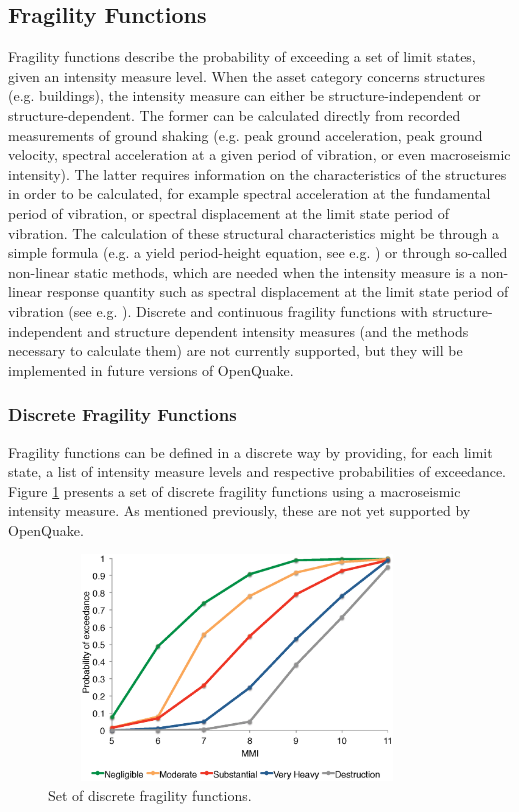 \subsection{Fragility Functions}
Fragility functions describe the probability of exceeding a set of limit states, given an intensity measure level. When the asset category concerns structures (e.g. buildings), the intensity measure can either be structure-independent or structure-dependent. The former can be calculated directly from recorded measurements of ground shaking (e.g. peak ground acceleration, peak ground velocity, spectral acceleration at a given period of vibration, or even macroseismic intensity). The latter requires information on the characteristics of the structures in order to be calculated, for example spectral acceleration at the fundamental period of vibration, or spectral displacement at the limit state period of vibration. The calculation of these structural characteristics might be through a simple formula (e.g. a yield period-height equation, see e.g. \citet{CrowleyPinho2004} ) or through so-called non-linear static methods, which are needed when the intensity measure is a non-linear response quantity such as spectral displacement at the limit state period of vibration (see e.g. \citet{FEMA440ATC2005}).
Discrete and continuous fragility functions with structure-independent and structure dependent intensity measures (and the methods necessary to calculate them) are not currently supported, but they will be implemented in future versions of OpenQuake. 

\subsubsection{Discrete Fragility Functions}
Fragility functions can be defined in a discrete way by providing, for each limit state, a list of intensity measure levels and respective probabilities of exceedance. Figure \ref{fig:FFDiscrete} presents a set of discrete fragility functions using a macroseismic intensity measure. As mentioned previously, these are not yet supported by OpenQuake.

\begin{figure}[ht]
\centering
\includegraphics[width=10cm,height=6cm]{./Figures/Part_Risk/FFDiscrete.eps}
\caption{Set of discrete fragility functions.}
\label{fig:FFDiscrete}
\end{figure}

